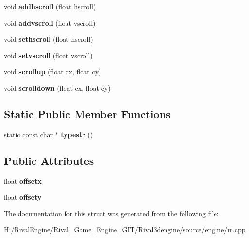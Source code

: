 \begin{DoxyCompactItemize}
\mbox{\label{struct_u_i_1_1_scroller_a02eca00ba04a5139f8d1b93be1ec5cfb}} 
void {\bfseries addhscroll} (float hscroll)
\item 
\mbox{\label{struct_u_i_1_1_scroller_a6f9e0d8cce74a88b82cc0ab6e60d6ac0}} 
void {\bfseries addvscroll} (float vscroll)
\item 
\mbox{\label{struct_u_i_1_1_scroller_ab176652e5ba69cb7fcce20da46d58697}} 
void {\bfseries sethscroll} (float hscroll)
\item 
\mbox{\label{struct_u_i_1_1_scroller_a3a611836d82cd26fcacdbf885dbdbeed}} 
void {\bfseries setvscroll} (float vscroll)
\item 
\mbox{\label{struct_u_i_1_1_scroller_a43603f43f7d18f58707f2a44f981fd49}} 
void {\bfseries scrollup} (float cx, float cy)
\item 
\mbox{\label{struct_u_i_1_1_scroller_a425148710270313261fbafd8ce7f2757}} 
void {\bfseries scrolldown} (float cx, float cy)
\end{DoxyCompactItemize}
\subsection*{Static Public Member Functions}
\begin{DoxyCompactItemize}
\item 
\mbox{\label{struct_u_i_1_1_scroller_a04c57ca2692940f6fdaccc7ab85b1eba}} 
static const char $\ast$ {\bfseries typestr} ()
\end{DoxyCompactItemize}
\subsection*{Public Attributes}
\begin{DoxyCompactItemize}
\item 
\mbox{\label{struct_u_i_1_1_scroller_a5aa059edd82770597df2819c2569f253}} 
float {\bfseries offsetx}
\item 
\mbox{\label{struct_u_i_1_1_scroller_a4a6dc5db5504a85d4b00854231670f28}} 
float {\bfseries offsety}
\end{DoxyCompactItemize}


The documentation for this struct was generated from the following file\+:\begin{DoxyCompactItemize}
\item 
H\+:/\+Rival\+Engine/\+Rival\+\_\+\+Game\+\_\+\+Engine\+\_\+\+G\+I\+T/\+Rival3dengine/source/engine/ui.\+cpp\end{DoxyCompactItemize}
